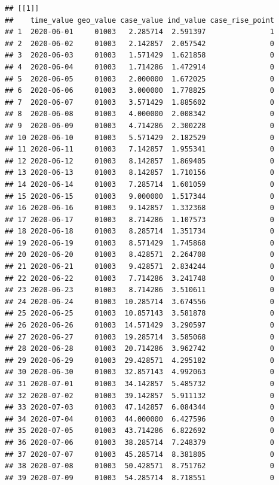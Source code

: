 \documentclass[]{article}
\begin{document}
\begin{verbatim}
## [[1]]
##    time_value geo_value case_value ind_value case_rise_point
## 1  2020-06-01     01003   2.285714  2.591397               1
## 2  2020-06-02     01003   2.142857  2.057542               0
## 3  2020-06-03     01003   1.571429  1.621858               0
## 4  2020-06-04     01003   1.714286  1.472914               0
## 5  2020-06-05     01003   2.000000  1.672025               0
## 6  2020-06-06     01003   3.000000  1.778825               0
## 7  2020-06-07     01003   3.571429  1.885602               0
## 8  2020-06-08     01003   4.000000  2.008342               0
## 9  2020-06-09     01003   4.714286  2.300228               0
## 10 2020-06-10     01003   5.571429  2.182529               0
## 11 2020-06-11     01003   7.142857  1.955341               0
## 12 2020-06-12     01003   8.142857  1.869405               0
## 13 2020-06-13     01003   8.142857  1.710156               0
## 14 2020-06-14     01003   7.285714  1.601059               0
## 15 2020-06-15     01003   9.000000  1.517344               0
## 16 2020-06-16     01003   9.142857  1.332368               0
## 17 2020-06-17     01003   8.714286  1.107573               0
## 18 2020-06-18     01003   8.285714  1.351734               0
## 19 2020-06-19     01003   8.571429  1.745868               0
## 20 2020-06-20     01003   8.428571  2.264708               0
## 21 2020-06-21     01003   9.428571  2.834244               0
## 22 2020-06-22     01003   7.714286  3.241748               0
## 23 2020-06-23     01003   8.714286  3.510611               0
## 24 2020-06-24     01003  10.285714  3.674556               0
## 25 2020-06-25     01003  10.857143  3.581878               0
## 26 2020-06-26     01003  14.571429  3.290597               0
## 27 2020-06-27     01003  19.285714  3.585068               0
## 28 2020-06-28     01003  20.714286  3.962742               0
## 29 2020-06-29     01003  29.428571  4.295182               0
## 30 2020-06-30     01003  32.857143  4.992063               0
## 31 2020-07-01     01003  34.142857  5.485732               0
## 32 2020-07-02     01003  39.142857  5.911132               0
## 33 2020-07-03     01003  47.142857  6.084344               0
## 34 2020-07-04     01003  44.000000  6.427596               0
## 35 2020-07-05     01003  43.714286  6.822692               0
## 36 2020-07-06     01003  38.285714  7.248379               0
## 37 2020-07-07     01003  45.285714  8.381805               0
## 38 2020-07-08     01003  50.428571  8.751762               0
## 39 2020-07-09     01003  54.285714  8.718551               0

\end{verbatim}
\end{document}

